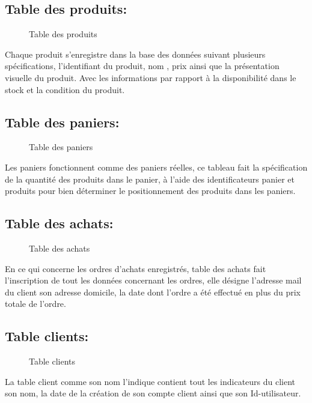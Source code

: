 \documentclass[a4paper]{report}
\begin{document}
\begin{doublespace}
	\subsection{ Table des produits: }
	\begin{figure}[H]

		\caption{Table des produits}
	\end{figure}
	Chaque produit s'enregistre dans la base des données
	suivant plusieurs spécifications, l'identifiant du produit, nom , prix ainsi
	que la présentation visuelle du produit. Avec les informations par rapport à la
	disponibilité dans le stock et la condition du produit.
	\subsection{ Table des paniers: }
	\begin{figure}[H]

		\caption{Table des paniers}
	\end{figure}
	Les paniers fonctionnent comme des paniers réelles, ce
	tableau fait la spécification de la quantité des produits dans le panier,  à
	l'aide des identificateurs panier et produits pour bien déterminer le
	positionnement des produits dans les paniers.
	\subsection{ Table des achats: }
	\begin{figure}[H]

		\caption{Table des achats}
	\end{figure}
	En ce qui concerne les ordres d'achats enregistrés,
	table  des achats fait l'inscription de tout les données concernant les ordres,
	elle désigne l'adresse mail du client son adresse domicile, la	date dont
	l'ordre a été effectué en plus du prix totale de l'ordre.
	\subsection{ Table clients: }
	\begin{figure}[H]

		\caption{Table clients}
	\end{figure}
	La table client comme son nom l'indique contient tout
	les indicateurs du client son nom, la date de la création de son compte client
	ainsi que son Id-utilisateur.


\end{doublespace}
\end{document}
